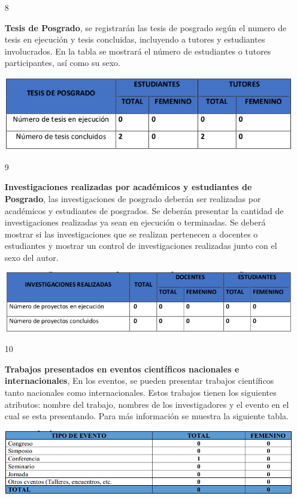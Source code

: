 \documentclass[12pt,letterpaper]{report}
\newcommand{\mb}{\vspace{0.5cm}}
\begin{document}
\begin{itemize}
\item[8]{
\textbf{Tesis de Posgrado}, se registrarán las tesis de posgrado según el numero de tesis en ejecución y tesis concluidas, incluyendo a tutores y estudiantes involucrados. En la tabla se mostrará el número de estudiantes o tutores participantes, así como su sexo.

\mb
\centering
	\includegraphics[width=\textwidth]{img/tabla8.png}\par
\mb
}


\item[9]{
\textbf{Investigaciones realizadas por académicos y estudiantes de Posgrado}, las investigaciones de posgrado deberán ser realizadas por académicos y estudiantes de posgrados. Se deberán presentar la cantidad de investigaciones realizadas ya sean en ejecución o terminadas. Se deberá mostrar si las investigaciones que se realizan pertenecen a docentes o estudiantes y mostrar un control de investigaciones realizadas junto con el sexo del autor.

\mb
\centering
	\includegraphics[width=\textwidth]{img/tabla9.png}\par
\mb
}


\item[10]{
\textbf{Trabajos presentados en eventos científicos nacionales e internacionales}, En los eventos, se pueden presentar trabajos científicos tanto nacionales como internacionales. Estos trabajos tienen los siguientes atributos: nombre del trabajo, nombres de los investigadores y el evento en el cual se esta presentando. Para más información se muestra la siguiente tabla.

\mb
\centering
	\includegraphics[width=\textwidth]{img/tabla10.png}\par
\mb 
}



\end{itemize}
\end{document}
